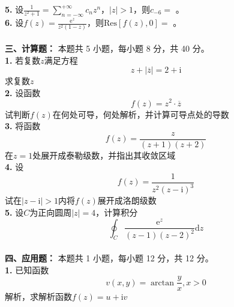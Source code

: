 \documentclass[14pt,a4paper,UTF8]{ctexart}
\begin{document}
	\textbf{5. } 设$\frac{1}{z^2+1}=\sum\limits_{n=-\infty}^{+\infty}c_nz^n$，$\left|z\right|>1$，则$c_{-6} = $ \underline{\hspace*{6em}}。\\
	\textbf{6. } 设$ f\left(z\right)=\frac{\mathrm{e}^z}{z^2\left(1-z\right)} $，则$\mathrm{Res}\left[f\left(z\right),0\right] = $ \underline{\hspace*{6em}}。\\
    \\
    \textbf{三、计算题：} 本题共 5 小题，每小题 8 分，共 40 分。\\
	\textbf{1. } 若复数$z$满足方程
    $$
	z+\left|\overline{z}\right|=2+\mathrm{i}
	$$
	求复数$z$
	\\[20pt]
	\textbf{2. } 设函数
    $$
    f\left(z\right)=z^2\cdot\overline{z}
    $$
    试判断$f\left(z\right)$在何处可导，何处解析，并计算可导点处的导数
	\\[20pt]
    \textbf{3. } 将函数
    $$
    f\left(z\right)=\frac{z}{\left(z+1\right)\left(z+2\right)}
    $$
    在$z=1$处展开成泰勒级数，并指出其收敛区域
	\\[20pt]
	\textbf{4. } 设
    $$
    f\left(z\right)=\frac{1}{z^2\left(z-\mathrm{i}\right)^3}
    $$
    试在$\left| z-\mathrm{i} \right|>1$内将$f\left(z\right)$展开成洛朗级数
	\\[20pt]
	\textbf{5. } 设$C$为正向圆周$\left|z\right|=4$，计算积分
    $$
    \oint_C{\frac{\mathrm{e}^z}{\left(z-1\right)\left(z-2\right)^2}\mathrm{d}z}
    $$
	\\
    \textbf{四、应用题：} 本题共 1 小题，每小题 12 分，共 12 分。\\
    \textbf{1. } 已知函数
	$$
	v\left(x,y\right)=\arctan\frac{y}{x},x>0
	$$
	解析，求解析函数$f\left(z\right)=u+\mathrm{i}v$
 
\end{document}
